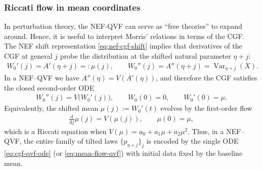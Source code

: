\documentclass[a4paper,11pt]{article}
\numberwithin{equation}{section}
\theoremstyle{plain}
\theoremstyle{definition}
\theoremstyle{remark}
\newcommand{\1}{\ensuremath{\mathds{1}}\xspace}
\newcommand{\dd}{\ensuremath{{\textrm{d}}}\xspace}
\DeclareMathOperator{\Var}{Var}
\begin{document}
\subsubsection{Riccati flow in mean coordinates}
In perturbation theory, the NEF-QVF can serve as ``free theories'' to expand around. Hence, it is useful to interpret Morris' relations in terms of the CGF. The NEF shift representation \eqref{eq:nef-cgf-shift} implies that derivatives of the CGF at general $j$
probe the distribution at the shifted natural parameter $\eta+j$:
\begin{align}
W_0'(j)=A'(\eta+j)=:\mu(j),
\qquad
W_0''(j)=A''(\eta+j)=\Var_{\eta+j}(X).
\end{align}
In a NEF--QVF we have $A''(\eta)=V(A'(\eta))$, and therefore the CGF satisfies the closed second-order ODE
\begin{align}
W_0''(j)=V\!\big(W_0'(j)\big),
\qquad
W_0(0)=0,
\qquad
W_0'(0)=\mu.
\label{eq:cgf-qvf-ode}
\end{align}
Equivalently, the shifted mean $\mu(j):=W_0'(t)$ evolves by the first-order flow
\begin{align}
\frac{\dd}{\dd j}\mu(j)=V(\mu(j)),
\qquad
\mu(0)=\mu,
\label{eq:mean-flow-qvf}
\end{align}
which is a Riccati equation when $V(\mu)=a_0+a_1\mu+a_2\mu^2$.
Thus, in a NEF--QVF, the entire family of tilted laws $\{p_{\eta+j}\}_{j}$ is encoded by the single
ODE \eqref{eq:cgf-qvf-ode} (or \eqref{eq:mean-flow-qvf}) with initial data fixed by the baseline mean.
\end{document}
